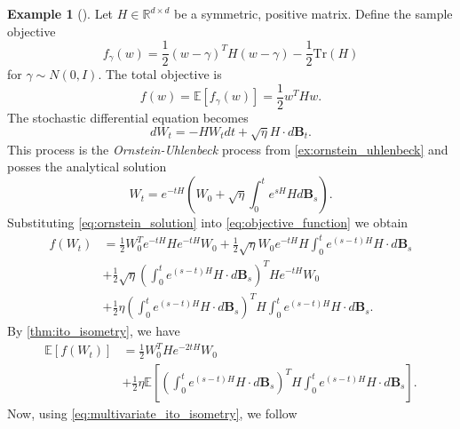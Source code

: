 \documentclass[12pt]{article}
\theoremstyle{definition}
\newtheorem{example}[example]{Example}
\numberwithin{equation}{section}
\newcommand{\ev}[1]{\mathbb{E}\left[{#1}\right]}
\begin{document}
\begin{example}[\autocite{liStochasticModifiedEquations2019}]
  Let $H \in \mathbb{R}^{d\times d}$ be a symmetric, positive matrix. Define the sample objective 
\begin{equation*}
  f_{\gamma}(w) = \frac{1}{2} (w - \gamma)^T H (w - \gamma) - \frac{1}{2} \text{Tr}(H)
\end{equation*}
for $\gamma \sim N(0,I)$. The total objective is 
\begin{equation*}
  \label{eq:objective_function}
  f(w) = \ev{f_{\gamma}(w)} = \frac{1}{2} w^T H w.
\end{equation*}
The stochastic differential equation becomes 
\begin{equation*}
  dW_t = -H W_t dt + \sqrt{\eta}H \cdot d\pmb{B}_t.
\end{equation*}
This process is the \emph{Ornstein-Uhlenbeck} process from \autoref{ex:ornstein_uhlenbeck} and posses the analytical solution
\begin{equation}
  \label{eq:ornstein_solution}
  W_t = e^{-t H}\left(W_0 + \sqrt{\eta}\int_0^te^{s H}H d\pmb{B}_s\right).
\end{equation}
Substituting \eqref{eq:ornstein_solution} into \eqref{eq:objective_function} we obtain
\begin{equation*}
  \begin{split}
    f(W_t) &= \frac{1}{2} W_0^Te^{-tH}He^{-tH}W_0 +
     \frac{1}{2} \sqrt{\eta}W_0e^{-tH}H\int_0^t e^{(s-t)H}H\cdot d\pmb{B}_s \\ 
    &+ \frac{1}{2} \sqrt{\eta}\left(\int_0^t e^{(s-t)H}H\cdot d\pmb{B}_s\right)^T He^{-tH}W_0 \\
    &+ \frac{1}{2} \eta \left(\int_0^t e^{(s-t)H}H\cdot d\pmb{B}_s\right)^T H\int_0^t e^{(s-t)H}H\cdot d\pmb{B}_s.
  \end{split}
\end{equation*}
By \autoref{thm:ito_isometry}, we have 
\begin{equation*}
  \begin{split}
  \ev{f(W_t)} &= \frac{1}{2}W_0^THe^{-2tH}W_0 \\
  &+ \frac{1}{2} \eta \ev{ \left(\int_0^t e^{(s-t)H}H\cdot d\pmb{B}_s\right)^T H\int_0^t e^{(s-t)H}H\cdot d\pmb{B}_s}.
  \end{split}
\end{equation*}
Now, using \eqref{eq:multivariate_ito_isometry}, we follow
\begin{equation}
  \begin{split}
    \label{eq:analytical_expected_value}

\end{split}
\end{equation}
\end{example}
\end{document}

